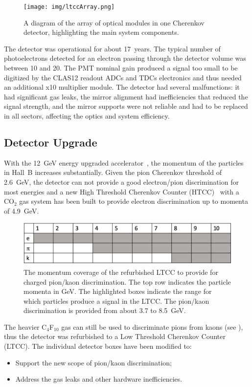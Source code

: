 \begin{figure}[ht]
	\centering
	\texttt{[image: img/ltccArray.png]}
	\caption{A diagram of the array of optical modules in one Cherenkov detector, highlighting
          the main system components.}
	\label{fig:ltccArray}
\end{figure}

The detector was operational for about 17~years. The typical number of photoelectrons detected for an electron
passing through the detector volume was between 10 and 20. The PMT nominal gain produced a signal too small
to be digitized by the CLAS12 readout ADCs and TDCs electronics and thus needed an additional x10 multiplier module.
The detector had several malfunctions: it had significant gas leaks, the
mirror alignment had inefficiencies that reduced the signal strength, and the mirror supports were not reliable
and had to be replaced in all
sectors, affecting the optics and system efficiency.

\subsection{Detector Upgrade}

With the 12~GeV energy upgraded accelerator~\cite{TDR12}, the momentum of the particles in Hall~B increases
substantially. Given the pion Cherenkov threshold of 2.6~GeV, the detector can not provide a good electron/pion
discrimination for most energies and a new High Threshold Cherenkov Counter (HTCC)~\cite{htcc-nim} with a
CO$_2$ gas system has been built to provide electron discrimination up to momenta of 4.9~GeV.

\begin{figure}[h]
	\centering
	\includegraphics[width=0.99\columnwidth,keepaspectratio]{img/newScope.png}
	\caption{The momentum coverage of the refurbished LTCC to provide for charged pion/kaon discrimination.
          The top row indicates the particle momenta in GeV. The highlighted boxes indicate the range for which particles
          produce a signal in the LTCC. The pion/kaon discrimination is provided from about 3.7 to 8.5~GeV.}
	\label{fig:newScope}
\end{figure}

The heavier C$_4$F$_{10}$ gas can still be used to discriminate pions from kaons (see ), thus the
detector was refurbished to a Low Threshold Cherenkov Counter (LTCC). The individual detector boxes have
been modified to:

\begin{itemize}
	\item Support the new scope of pion/kaon discrimination;
	\item Address the gas leaks and other hardware inefficiencies.
\end{itemize}
